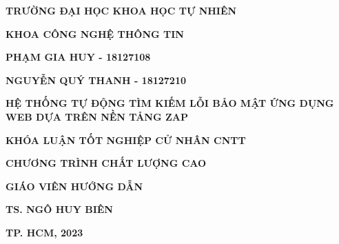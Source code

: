 \newpage
\begin{center}
        
    \textbf{\large TRƯỜNG ĐẠI HỌC KHOA HỌC TỰ NHIÊN} 
    
    \textbf{\large KHOA CÔNG NGHỆ THÔNG TIN}
    
    \vspace{2cm}
    
    \textbf{\large PHẠM GIA HUY - 18127108}
    
    \textbf{\large NGUYỄN QUÝ THANH - 18127210}
    
    \vspace{2cm}
    
    \textbf{\large HỆ THỐNG TỰ ĐỘNG TÌM KIẾM LỖI BẢO MẬT ỨNG DỤNG WEB DỰA TRÊN NỀN TẢNG ZAP }
    
    \vspace{2cm}
    
    \textbf{\large KHÓA LUẬN TỐT NGHIỆP CỬ NHÂN CNTT}

    \textbf{\large CHƯƠNG TRÌNH CHẤT LƯỢNG CAO}
    
    \vspace{2cm}
    
    \textbf{\large GIÁO VIÊN HƯỚNG DẪN}
    
    \textbf{\large TS. NGÔ HUY BIÊN}
    
    \vspace{6.5cm}
    
    \textbf{\large TP. HCM, 2023 }    
\end{center}


    

    